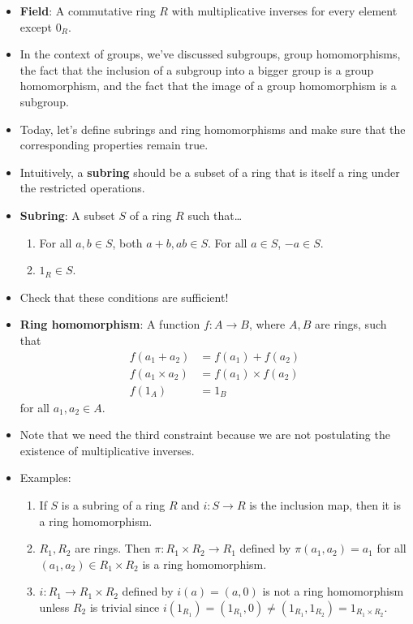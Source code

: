 \documentclass[../notes.tex]{subfiles}
\begin{document}
\begin{itemize}
\begin{enumerate}
    \end{enumerate}
    \item \textbf{Field}: A commutative ring $R$ with multiplicative inverses for every element except $0_R$.
    \item In the context of groups, we've discussed subgroups, group homomorphisms, the fact that the inclusion of a subgroup into a bigger group is a group homomorphism, and the fact that the image of a group homomorphism is a subgroup.
    \item Today, let's define subrings and ring homomorphisms and make sure that the corresponding properties remain true.
    \item Intuitively, a \textbf{subring} should be a subset of a ring that is itself a ring under the restricted operations.
    \item \textbf{Subring}: A subset $S$ of a ring $R$ such that\dots
    \begin{enumerate}[label={(\roman*)}]
        \item For all $a,b\in S$, both $a+b,ab\in S$. For all $a\in S$, $-a\in S$.
        \item $1_R\in S$.
    \end{enumerate}
    \item Check that these conditions are sufficient!
    \item \textbf{Ring homomorphism}: A function $f:A\to B$, where $A,B$ are rings, such that
    \begin{align*}
        f(a_1+a_2) &= f(a_1)+f(a_2)\\
        f(a_1\times a_2) &= f(a_1)\times f(a_2)\\
        f(1_A) &= 1_B
    \end{align*}
    for all $a_1,a_2\in A$.
    \item Note that we need the third constraint because we are not postulating the existence of multiplicative inverses.
    \item Examples:
    \begin{enumerate}
        \item If $S$ is a subring of a ring $R$ and $i:S\to R$ is the inclusion map, then it is a ring homomorphism.
        \item $R_1,R_2$ are rings. Then $\pi:R_1\times R_2\to R_1$ defined by $\pi(a_1,a_2)=a_1$ for all $(a_1,a_2)\in R_1\times R_2$ is a ring homomorphism.
        \item $i:R_1\to R_1\times R_2$ defined by $i(a)=(a,0)$ is not a ring homomorphism unless $R_2$ is trivial since $i(1_{R_1})=(1_{R_1},0)\neq (1_{R_1},1_{R_2})=1_{R_1\times R_2}$.

\end{enumerate}
\end{itemize}
\end{document}
